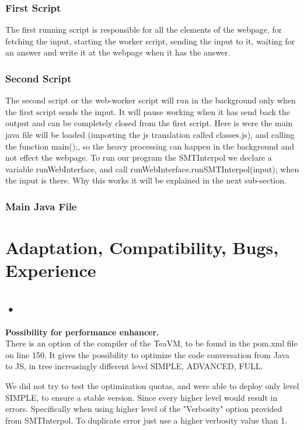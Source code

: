 \documentclass[]{article}
\begin{document}
\subsubsection{First Script}
The first running script is responsible for all the elements of the webpage, for fetching the input, starting the worker script, sending the input to it, waiting for an answer and write it at the webpage when it has the answer.
\subsubsection{Second Script} The second script or the web-worker script will run in the background only when the first script sends the input. It will pause working when it has send back the output and can be completely  closed from the first script.
Here is were the main java file will be loaded (importing the js translation called classes.js), and calling the function main();, so the heavy processing can happen in the background and not effect the webpage. To run our program the SMTInterpol we declare a variable runWebInterface, and call runWebInterface.runSMTInterpol(input); when the input is there. Why this works it will be explained in the next sub-section.

\subsubsection{Main Java File}



\section{Adaptation, Compatibility, Bugs, Experience}


\subsection{•}  \textbf{Possibility for performance enhancer.} \\
There is an option of the compiler of the TeaVM, to be found in the pom.xml file on line 150. It gives the possibility to optimize the code conversation from Java to JS, in tree increasingly different level SIMPLE, ADVANCED, FULL.

We did not try to test the optimization quotas, and were able to deploy only level SIMPLE, to ensure a stable version.
Since every higher level would result in  errors. Specifically when using higher level of the "Verbosity" option provided from SMTInterpol. To duplicate error just use a higher verbosity value than 1.
\end{document}
